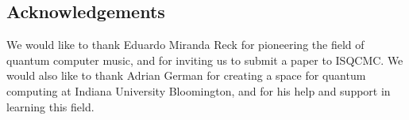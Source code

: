\documentclass[10pt,twocolumn]{article}
\begin{document}
\subsection{Acknowledgements}

We would like to thank Eduardo Miranda Reck for pioneering the field of quantum computer music, and for inviting us to submit a paper to ISQCMC. We would also like to thank Adrian German for creating a space for quantum computing at Indiana University Bloomington, and for his help and support in learning this field.







\end{document}
